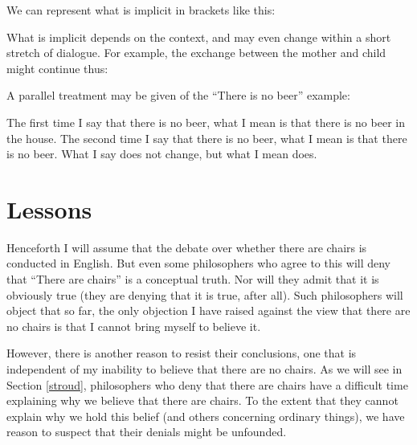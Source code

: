 \documentclass[11pt]{article}
\begin{document}
\begin{spacing}{1.25}
We can represent what is implicit in brackets like this:


\noindent What is implicit depends on the context, and may even change
within a short stretch of dialogue.  For example, the exchange between
the mother and child might continue thus:




A parallel treatment may be given of the ``There is no beer'' example:




The first time I say that there is no beer, what I mean is that there
is no beer in the house.  The second time I say that there is no beer,
what I mean is that there is no beer.  What I say does not change, but
what I mean does.

\section{Lessons}
\label{lessons-verb}
Henceforth I will assume that the debate over whether there are chairs
is conducted in English.  But even some philosophers who agree to this
will deny that ``There are chairs'' is a conceptual truth.  Nor will
they admit that it is obviously true (they are denying that it is
true, after all).  Such philosophers will object that so far, the only
objection I have raised against the view that there are no chairs is
that I cannot bring myself to believe it.

However, there is another reason to resist their conclusions, one that
is independent of my inability to believe that there are no chairs.
As we will see in Section \ref{stroud}, philosophers who deny that
there are chairs have a difficult time explaining why we believe that
there are chairs.  To the extent that they cannot explain why we hold
this belief (and others concerning ordinary things), we have reason to
suspect that their denials might be unfounded.

\ifstandalone
\end{spacing}


\fi
\end{document}
